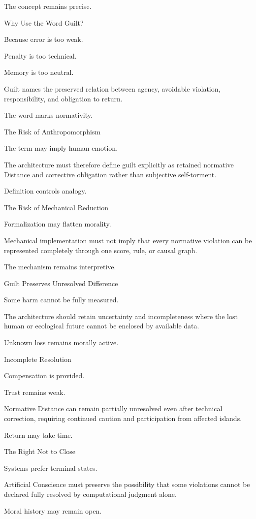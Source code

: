 The concept remains precise.

Why Use the Word Guilt?

Because error is too weak.

Penalty is too technical.

Memory is too neutral.

Guilt names the preserved relation between agency, avoidable violation, responsibility, and obligation to return.

The word marks normativity.

The Risk of Anthropomorphism

The term may imply human emotion.

The architecture must therefore define guilt explicitly as retained normative Distance and corrective obligation rather than subjective self-torment.

Definition controls analogy.

The Risk of Mechanical Reduction

Formalization may flatten morality.

Mechanical implementation must not imply that every normative violation can be represented completely through one score, rule, or causal graph.

The mechanism remains interpretive.

Guilt Preserves Unresolved Difference

Some harm cannot be fully measured.

The architecture should retain uncertainty and incompleteness where the lost human or ecological future cannot be enclosed by available data.

Unknown loss remains morally active.

Incomplete Resolution

Compensation is provided.

Trust remains weak.

Normative Distance can remain partially unresolved even after technical correction, requiring continued caution and participation from affected islands.

Return may take time.

The Right Not to Close

Systems prefer terminal states.

Artificial Conscience must preserve the possibility that some violations cannot be declared fully resolved by computational judgment alone.

Moral history may remain open.

